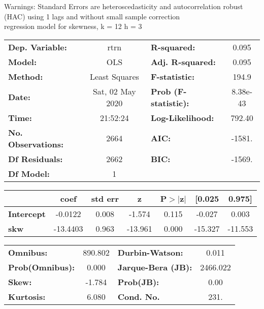 Warnings: \newline
 [1] Standard Errors are heteroscedasticity and autocorrelation robust (HAC) using 1 lags and without small sample correction\\ 

regression model for skewness, k = 12 h = 3\begin{center}
\begin{tabular}{lclc}
\toprule
\textbf{Dep. Variable:}    &       rtrn       & \textbf{  R-squared:         } &     0.095   \\
\textbf{Model:}            &       OLS        & \textbf{  Adj. R-squared:    } &     0.095   \\
\textbf{Method:}           &  Least Squares   & \textbf{  F-statistic:       } &     194.9   \\
\textbf{Date:}             & Sat, 02 May 2020 & \textbf{  Prob (F-statistic):} &  8.38e-43   \\
\textbf{Time:}             &     21:52:24     & \textbf{  Log-Likelihood:    } &    792.40   \\
\textbf{No. Observations:} &        2664      & \textbf{  AIC:               } &    -1581.   \\
\textbf{Df Residuals:}     &        2662      & \textbf{  BIC:               } &    -1569.   \\
\textbf{Df Model:}         &           1      & \textbf{                     } &             \\
\bottomrule
\end{tabular}
\begin{tabular}{lcccccc}
                   & \textbf{coef} & \textbf{std err} & \textbf{z} & \textbf{P$> |$z$|$} & \textbf{[0.025} & \textbf{0.975]}  \\
\midrule
\textbf{Intercept} &      -0.0122  &        0.008     &    -1.574  &         0.115        &       -0.027    &        0.003     \\
\textbf{skw}       &     -13.4403  &        0.963     &   -13.961  &         0.000        &      -15.327    &      -11.553     \\
\bottomrule
\end{tabular}
\begin{tabular}{lclc}
\textbf{Omnibus:}       & 890.802 & \textbf{  Durbin-Watson:     } &    0.011  \\
\textbf{Prob(Omnibus):} &   0.000 & \textbf{  Jarque-Bera (JB):  } & 2466.022  \\
\textbf{Skew:}          &  -1.784 & \textbf{  Prob(JB):          } &     0.00  \\
\textbf{Kurtosis:}      &   6.080 & \textbf{  Cond. No.          } &     231.  \\
\bottomrule
\end{tabular}
\end{center}


